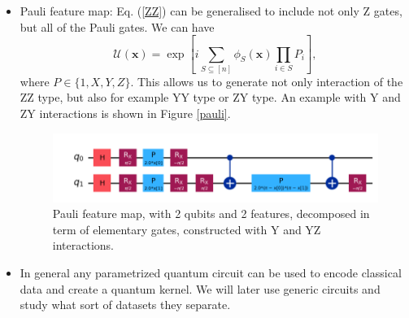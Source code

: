 \documentclass[12pt]{article}
\begin{document}
\begin{itemize}
    \item Pauli feature map: Eq. (\ref{ZZ}) can be generalised to include not only Z gates, but all of the Pauli gates. We can have
    \begin{equation}
        \mathcal{U}(\mathbf{x})=\exp\left[i\sum_{S\subseteq [n]}\phi_S(\mathbf{x})\prod_{i\in S}P_i\right],
        \label{pauli}
    \end{equation}
    where $P\in\{1,X,Y,Z\}$. This allows us to generate not only interaction of the ZZ type, but also for example YY type or ZY type. An example with Y and ZY interactions is shown in Figure \ref{pauli}.
    \begin{figure}[h!]
        \centering
        \includegraphics[width=\textwidth]{images/pauli.png}
        \caption{Pauli feature map, with 2 qubits and 2 features, decomposed in term of elementary gates, constructed with Y and YZ interactions.}
        \label{fig:Pauli}
    \end{figure}
    \item In general any parametrized quantum circuit can be used to encode classical data and create a quantum kernel. We will later use generic circuits and study what sort of datasets they separate.
\end{itemize}
\end{document}
